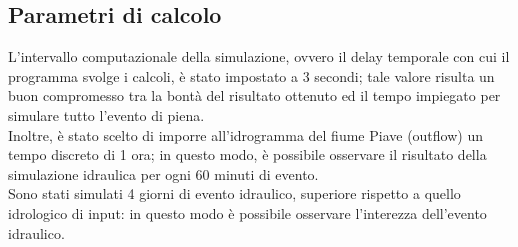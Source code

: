 \subsection{Parametri di calcolo}
L'intervallo computazionale della simulazione, ovvero il delay temporale con cui il programma svolge i calcoli, è stato impostato a 3 secondi; tale valore risulta un buon compromesso tra la bontà del risultato ottenuto ed il tempo impiegato per simulare tutto l'evento di piena.\\
Inoltre, è stato scelto di imporre all'idrogramma del fiume Piave (outflow) un tempo discreto di 1 ora; in questo modo, è possibile osservare il risultato della simulazione idraulica per ogni 60 minuti di evento.\\
Sono stati simulati 4 giorni di evento idraulico, superiore rispetto a quello idrologico di input: in questo modo è possibile osservare l'interezza dell'evento idraulico. 


